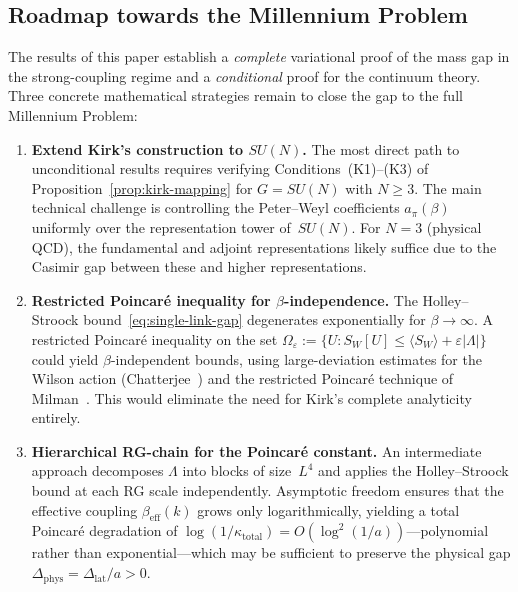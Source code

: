 \documentclass[12pt,a4paper]{article}
\theoremstyle{definition}
\theoremstyle{plain}
\theoremstyle{remark}
\begin{document}
\subsection{Roadmap towards the Millennium Problem}

The results of this paper establish a \emph{complete} variational proof
of the mass gap in the strong-coupling regime and a \emph{conditional}
proof for the continuum theory. Three concrete mathematical strategies
remain to close the gap to the full Millennium Problem:

\begin{enumerate}
    \item \textbf{Extend Kirk's construction to $SU(N)$.}
    The most direct path to unconditional results requires verifying
    Conditions~(K1)--(K3) of Proposition~\ref{prop:kirk-mapping} for
    $G = SU(N)$ with $N \geq 3$. The main technical challenge is
    controlling the Peter--Weyl coefficients $a_\pi(\beta)$ uniformly
    over the representation tower of~$SU(N)$. For $N = 3$ (physical
    QCD), the fundamental and adjoint representations likely suffice
    due to the Casimir gap between these and higher representations.

    \item \textbf{Restricted Poincar\'e inequality for $\beta$-independence.}
    The Holley--Stroock bound~\eqref{eq:single-link-gap} degenerates
    exponentially for $\beta \to \infty$. A restricted Poincar\'e
    inequality on the set $\Omega_\varepsilon := \{U : S_W[U] \leq
    \langle S_W\rangle + \varepsilon|\Lambda|\}$ could yield
    $\beta$-independent bounds, using large-deviation estimates for
    the Wilson action (Chatterjee~\cite{Chatterjee2016}) and the
    restricted Poincar\'e technique of
    Milman~\cite{Milman2009}. This would eliminate the need
    for Kirk's complete analyticity entirely.

    \item \textbf{Hierarchical RG-chain for the Poincar\'e constant.}
    An intermediate approach decomposes $\Lambda$ into blocks of
    size~$L^4$ and applies the Holley--Stroock bound at each RG scale
    independently. Asymptotic freedom ensures that the effective
    coupling $\beta_{\mathrm{eff}}(k)$ grows only logarithmically,
    yielding a total Poincar\'e degradation of
    $\log(1/\kappa_{\mathrm{total}}) = O(\log^2(1/a))$---polynomial
    rather than exponential---which may be sufficient to preserve the
    physical gap $\Delta_{\mathrm{phys}} = \Delta_{\mathrm{lat}}/a > 0$.
\end{enumerate}
\end{document}
